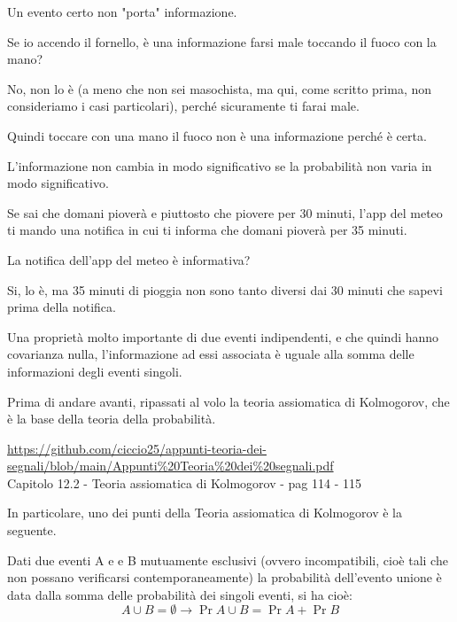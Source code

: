 Un evento certo non "porta" informazione. \newline 

\begin{tcolorbox}
    Se io accendo il fornello, 
    è una informazione farsi male toccando il fuoco con la mano? \newline 
    
    No, non lo è (a meno che non sei masochista, ma qui, come scritto prima, non consideriamo i casi particolari), 
    perché sicuramente ti farai male. \newline 
    
    Quindi toccare con una mano il fuoco non è una informazione perché è certa. 
\end{tcolorbox}

L'informazione non cambia in modo significativo se la probabilità non varia in modo significativo. \newline 

\begin{tcolorbox}
    Se sai che domani pioverà e piuttosto che piovere per 30 minuti, l'app del meteo ti mando una notifica in cui ti informa che domani pioverà per 35 minuti. \newline 

    La notifica dell'app del meteo è informativa? \newline 

    Si, lo è, ma 35 minuti di pioggia non sono tanto diversi dai 30 minuti che sapevi prima della notifica.
\end{tcolorbox}

Una proprietà molto importante di due eventi indipendenti, e che quindi hanno covarianza nulla, 
l'informazione ad essi associata è uguale alla somma delle informazioni degli eventi singoli. \newline 

\begin{tcolorbox}
    Prima di andare avanti, ripassati al volo la teoria assiomatica di Kolmogorov, 
    che è la base della teoria della probabilità. \newline 

    \url{https://github.com/ciccio25/appunti-teoria-dei-segnali/blob/main/Appunti%20Teoria%20dei%20segnali.pdf} \\
    Capitolo 12.2 - Teoria assiomatica di Kolmogorov - pag 114 - 115 \newline 

    In particolare, uno dei punti della Teoria assiomatica di Kolmogorov è la seguente. \newline 

    Dati due eventi A e e B mutuamente esclusivi 
    (ovvero incompatibili, cioè tali che non possano verificarsi contemporaneamente) la probabilità dell'evento unione è data dalla somma delle probabilità dei singoli eventi, si ha cioè: 
    {
        \Large 
        \begin{equation}
            A \cup B = \emptyset 
            \rightarrow 
            \Pr{A \cup B} = \Pr{A} + \Pr{B}
        \end{equation}
    }
\end{tcolorbox}

